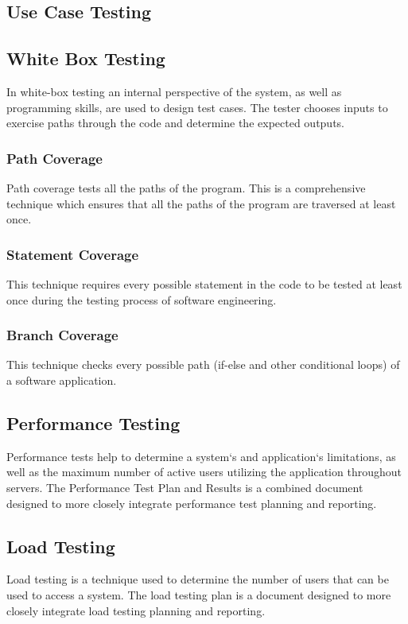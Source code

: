 \subsection{Use Case Testing}

\subsection{ White Box Testing}
In white-box testing an internal perspective of the system, as well as programming skills, are used to
design test cases. The tester chooses inputs to exercise paths through the code and determine the
expected outputs.




\subsubsection{ Path Coverage}
Path coverage tests all the paths of the program. This is a comprehensive technique which ensures
that all the paths of the program are traversed at least once.
\subsubsection{ Statement Coverage}
This technique requires every possible statement in the code to be tested at least once during the
testing process of software engineering.

\subsubsection{ Branch Coverage}
This technique checks every possible path (if-else and other conditional loops) of a software
application.

\subsection{Performance Testing}
Performance tests help to determine a system`s and application`s limitations, as well as the maximum
number of active users utilizing the application throughout servers. The Performance Test Plan and
Results is a combined document designed to more closely integrate performance test planning and
reporting.

\subsection{Load Testing}
Load testing is a technique used to determine the number of users that can be used to access a system.
The load testing plan is a document designed to more closely integrate load testing planning and
reporting.

